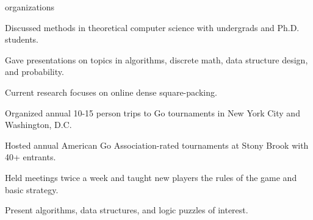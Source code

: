 \documentclass{cv}
\begin{document}
\begin{cvsection}{organizations}
  {
    \item Discussed methods in theoretical computer science with undergrads and Ph.D. students.
    \item Gave presentations on topics in algorithms, discrete math, data structure design, and probability.
    \item Current research focuses on online dense square-packing.
  }
  {
    \item Organized annual 10-15 person trips to Go tournaments in New York City and Washington, D.C.
    \item Hosted annual American Go Association-rated tournaments at Stony Brook with 40+ entrants.
    \item Held meetings twice a week and taught new players the rules of the game and basic strategy.
  }
  {
    \item Present algorithms, data structures, and logic puzzles of interest.
  } 
\end{cvsection}
%
%
\end{document}
